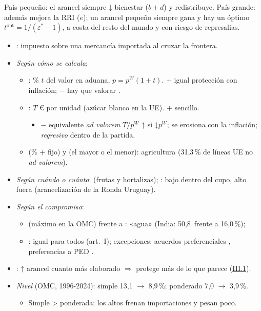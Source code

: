 \documentclass{article}
\begin{document}
\begin{columnas}
\begin{ideaclave}
País pequeño: el arancel siempre ↓ bienestar ($b+d$) y redistribuye. País grande: además mejora la RRI ($e$); un arancel pequeño siempre gana y hay un óptimo $t^{\mathrm{opt}}=1/(\varepsilon^*-1)$, a costa del resto del mundo y con riesgo de represalias.
\end{ideaclave}

\begin{itemize}
\item {}: impuesto sobre una mercancía importada al cruzar la frontera.
\item \emph{Según cómo se calcula}:
  \begin{itemize}
  \item {}: \% $t$ del valor en aduana, $p=p^W(1+t)$. $+$ igual protección con inflación; $-$ hay que valorar .
  \item {}: $T$ € por unidad (azúcar blanco en la UE). $+$ sencillo.
    \begin{itemize}
    \item $-$ equivalente \emph{ad valorem} $T/p^W$ ↑ si ↓$p^W$; se erosiona con la inflación; \emph{regresivo} dentro de la partida.
    \end{itemize}
  \item {} (\% + fijo) y  (el mayor o el menor): agricultura (31,3\,\% de líneas UE no \emph{ad valorem}).
  \end{itemize}
\item \emph{Según cuándo o cuánto}:  (frutas y hortalizas); : bajo dentro del cupo, alto fuera (arancelización de la Ronda Uruguay).
\item \emph{Según el compromiso}:
  \begin{itemize}
  \item {} (máximo en la OMC) frente a : «agua» (India: 50,8~frente a 16,0\,\%);
  \item {}: igual para todos (art.~I); excepciones: acuerdos preferenciales , preferencias a PED .
  \end{itemize}
\item {}: ↑ arancel cuanto más elaborado $\Rightarrow$ protege más de lo que parece (\hyperref[rep:III.1]{III.1}).
\item \emph{Nivel} (OMC, 1996-2024): simple 13,1 $\to$ 8,9\,\%; ponderado 7,0 $\to$ 3,9\,\%.
  \begin{itemize}
  \item Simple > ponderada: los altos frenan importaciones y pesan poco.
  \end{itemize}
\end{itemize}


\end{columnas}
\end{document}
